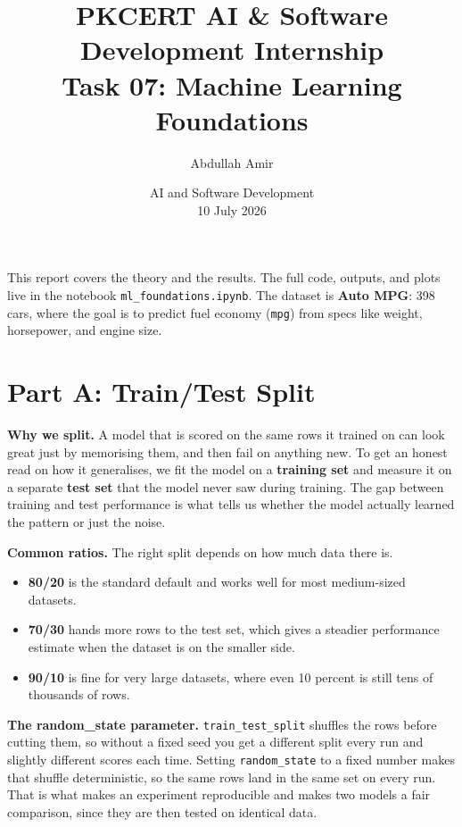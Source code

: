 \documentclass[11pt,a4paper]{article}
\title{\vspace{-1.5cm}\textbf{PKCERT AI \& Software Development Internship \\ Task 07: Machine Learning Foundations}}
\author{Abdullah Amir}
\date{AI and Software Development \\ 10 July 2026}
\begin{document}
\maketitle
\vspace{-0.8cm}

This report covers the theory and the results. The full code, outputs, and plots
live in the notebook \texttt{ml\_foundations.ipynb}. The dataset is
\textbf{Auto MPG}: 398 cars, where the goal is to predict fuel economy
(\texttt{mpg}) from specs like weight, horsepower, and engine size.

\section*{Part A: Train/Test Split}

\textbf{Why we split.} A model that is scored on the same rows it trained on can
look great just by memorising them, and then fail on anything new. To get an
honest read on how it generalises, we fit the model on a \textbf{training set}
and measure it on a separate \textbf{test set} that the model never saw during
training. The gap between training and test performance is what tells us whether
the model actually learned the pattern or just the noise.

\textbf{Common ratios.} The right split depends on how much data there is.
\begin{itemize}
    \item \textbf{80/20} is the standard default and works well for most
    medium-sized datasets.
    \item \textbf{70/30} hands more rows to the test set, which gives a steadier
    performance estimate when the dataset is on the smaller side.
    \item \textbf{90/10} is fine for very large datasets, where even 10 percent is
    still tens of thousands of rows.
\end{itemize}

\textbf{The random\_state parameter.} \texttt{train\_test\_split} shuffles the
rows before cutting them, so without a fixed seed you get a different split every
run and slightly different scores each time. Setting \texttt{random\_state} to a
fixed number makes that shuffle deterministic, so the same rows land in the same
set on every run. That is what makes an experiment reproducible and makes two
models a fair comparison, since they are then tested on identical data.
\end{document}
